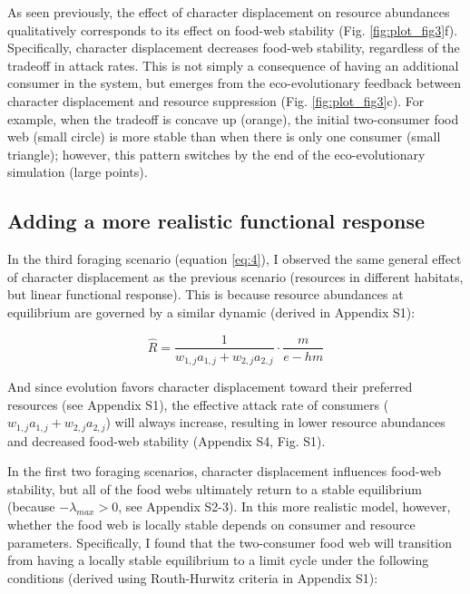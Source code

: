 \documentclass[11pt,]{article}
\begin{document}
As seen previously, the effect of character displacement on resource
abundances qualitatively corresponds to its effect on food-web stability
(Fig. \ref{fig:plot_fig3}f). Specifically, character displacement
decreases food-web stability, regardless of the tradeoff in attack
rates. This is not simply a consequence of having an additional consumer
in the system, but emerges from the eco-evolutionary feedback between
character displacement and resource suppression (Fig.
\ref{fig:plot_fig3}c). For example, when the tradeoff is concave up
(orange), the initial two-consumer food web (small circle) is more
stable than when there is only one consumer (small triangle); however,
this pattern switches by the end of the eco-evolutionary simulation
(large points).

\subsection{Adding a more realistic functional
response}\label{adding-a-more-realistic-functional-response}

In the third foraging scenario (equation \ref{eq:4}), I observed the
same general effect of character displacement as the previous scenario
(resources in different habitats, but linear functional response). This
is because resource abundances at equilibrium are governed by a similar
dynamic (derived in Appendix S1):

\begin{equation} \label{eq:7}
  \hat{R}=\frac{1}{w_{1,j}a_{1,j}+w_{2,j}a_{2,j}}\cdot\frac{m}{e-hm}
\end{equation}

And since evolution favors character displacement toward their preferred
resources (see Appendix S1), the effective attack rate of consumers
(\(w_{1,j}a_{1,j}+w_{2,j}a_{2,j}\)) will always increase, resulting in
lower resource abundances and decreased food-web stability (Appendix S4,
Fig. S1).

In the first two foraging scenarios, character displacement influences
food-web stability, but all of the food webs ultimately return to a
stable equilibrium (because \(-\lambda_{max}>0\), see Appendix S2-3). In
this more realistic model, however, whether the food web is locally
stable depends on consumer and resource parameters. Specifically, I
found that the two-consumer food web will transition from having a
locally stable equilibrium to a limit cycle under the following
conditions (derived using Routh-Hurwitz criteria in Appendix S1):
\end{document}
